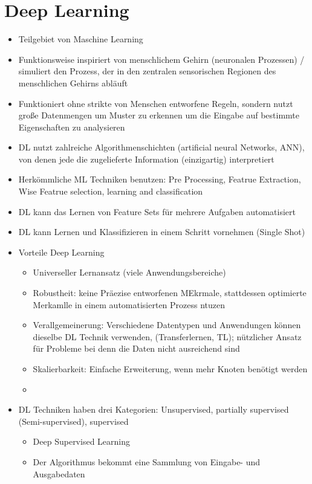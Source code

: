 \section{Deep Learning}
\begin{itemize}
    \item Teilgebiet von Maschine Learning
    \item Funktionsweise inspiriert von menschlichem Gehirn (neuronalen Prozessen) / simuliert den Prozess, der in den zentralen sensorischen Regionen des menschlichen Gehirns abläuft
    \item Funktioniert ohne strikte von Menschen entworfene Regeln, sondern nutzt große Datenmengen um Muster zu erkennen um die Eingabe auf bestimmte Eigenschaften zu analysieren
    \item DL nutzt zahlreiche Algorithmenschichten (artificial neural Networks, ANN), von denen jede die zugelieferte Information (einzigartig) interpretiert
    \item Herkömmliche ML Techniken benutzen: Pre Processing, Featrue Extraction, Wise Featrue selection, learning and classification
    \item DL kann das Lernen von Feature Sets für mehrere Aufgaben automatisiert
    \item DL kann Lernen und Klassifizieren in einem Schritt vornehmen (Single Shot)
    \item Vorteile Deep Learning
    \begin{itemize}
        \item Universeller Lernansatz (viele Anwendungsbereiche)
        \item Robustheit: keine Präezise entworfenen MEkrmale, stattdessen optimierte Merkamlle in einem automatisierten Prozess ntuzen
        \item Verallgemeinerung: Verschiedene Datentypen und Anwendungen können dieselbe DL Technik verwenden, (Transferlernen, TL); nützlicher Ansatz für Probleme bei denn die Daten nicht ausreichend sind
        \item Skalierbarkeit: Einfache Erweiterung, wenn mehr Knoten benötigt werden 
        \item 
    \end{itemize}
    \item DL Techniken haben drei Kategorien: Unsupervised, partially supervised (Semi-supervised), supervised
    \begin{itemize}
        \item Deep Supervised Learning
        \item Der Algorithmus bekommt eine Sammlung von Eingabe- und Ausgabedaten

\end{itemize}
\end{itemize}
